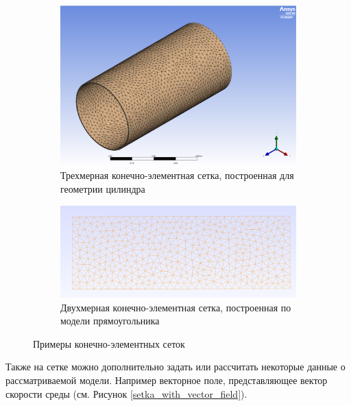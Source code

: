 \begin{figure}[H]
	\hfill
	\begin{subfigure}{.4\textwidth}
		\centering
		\includegraphics[width=\linewidth]{img/setka_example}
		\caption{Трехмерная конечно-элементная сетка, построенная для геометрии цилиндра}
	\end{subfigure}
	\hfill
	\begin{subfigure}{.5\textwidth}
		\centering
		\includegraphics[width=\linewidth]{img/setka_example_2d}
		\caption{Двухмерная конечно-элементная сетка, построенная по модели прямоугольника}
		\label{2d_setka}
	\end{subfigure}
	\hfill
	\caption{Примеры конечно-элементных сеток}
\end{figure}

Также на сетке можно дополнительно задать или рассчитать некоторые данные о рассматриваемой модели. Например векторное поле, представляющее вектор скорости среды (см. Рисунок \ref{setka_with_vector_field}).

